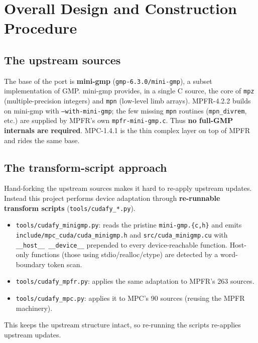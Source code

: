 \documentclass[uplatex,dvipdfmx,a4paper,11pt]{jsarticle}
\newcommand{\code}[1]{\texttt{#1}}
\begin{document}
\section{Overall Design and Construction Procedure}
\label{sec:procedure}

\subsection{The upstream sources}

The base of the port is \textbf{mini-gmp} (\code{gmp-6.3.0/mini-gmp}), a subset
implementation of GMP. mini-gmp provides, in a single C source, the core of
\code{mpz} (multiple-precision integers) and \code{mpn} (low-level limb arrays).
MPFR-4.2.2 builds on mini-gmp with \code{--with-mini-gmp}; the few missing
\code{mpn} routines (\code{mpn\_divrem}, etc.) are supplied by MPFR's own
\code{mpfr-mini-gmp.c}. Thus \textbf{no full-GMP internals are required}.
MPC-1.4.1 is the thin complex layer on top of MPFR and rides the same base.

\subsection{The transform-script approach}

Hand-forking the upstream sources makes it hard to re-apply upstream updates.
Instead this project performs device adaptation through \textbf{re-runnable
transform scripts} (\code{tools/cudafy\_*.py}).

\begin{itemize}
\item \code{tools/cudafy\_minigmp.py}: reads the pristine \code{mini-gmp.\{c,h\}}
      and emits \code{include/mpc\_cuda/cuda\_minigmp.h} and
      \code{src/cuda\_minigmp.cu} with \code{\_\_host\_\_ \_\_device\_\_} prepended
      to every device-reachable function. Host-only functions (those using
      stdio/realloc/ctype) are detected by a word-boundary token scan.
\item \code{tools/cudafy\_mpfr.py}: applies the same adaptation to MPFR's 263
      sources.
\item \code{tools/cudafy\_mpc.py}: applies it to MPC's 90 sources (reusing the
      MPFR machinery).
\end{itemize}

This keeps the upstream structure intact, so re-running the scripts re-applies
upstream updates.
\end{document}
